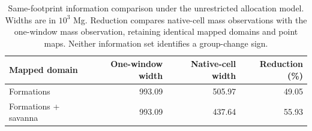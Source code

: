 \begin{table}[htbp]
\centering\small
\caption{Same-footprint information comparison under the unrestricted allocation model. Widths are in $10^3$ Mg. Reduction compares native-cell mass observations with the one-window mass observation, retaining identical mapped domains and point maps. Neither information set identifies a group-change sign.}\label{tab:frontier}
\begin{tabular}{lrrr}
\toprule
Mapped domain & One-window width & Native-cell width & Reduction (\%)\\\midrule
Formations & 993.09 & 505.97 & 49.05\\
Formations + savanna & 993.09 & 437.64 & 55.93\\
\bottomrule
\end{tabular}
\end{table}
